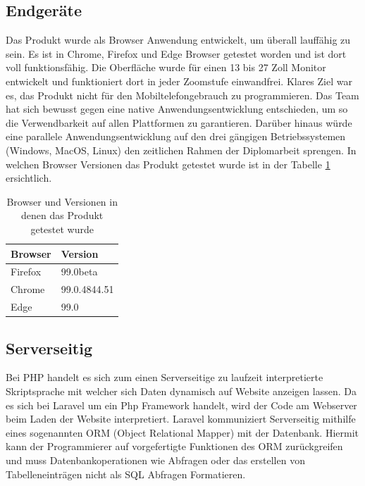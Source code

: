 \subsection{Endgeräte}
Das Produkt wurde als Browser Anwendung entwickelt, um überall lauffähig zu sein. Es ist in Chrome, Firefox und Edge Browser getestet worden und ist dort voll funktionsfähig. Die Oberfläche wurde für einen 13 bis 27 Zoll Monitor entwickelt und funktioniert dort in jeder Zoomstufe einwandfrei. Klares Ziel war es, das Produkt nicht für den Mobiltelefongebrauch zu programmieren. Das Team hat sich bewusst gegen eine native Anwendungsentwicklung entschieden, um so die Verwendbarkeit auf allen Plattformen zu garantieren. Darüber hinaus würde eine parallele Anwendungsentwicklung auf den drei gängigen Betriebssystemen (Windows, MacOS, Linux) den zeitlichen Rahmen der Diplomarbeit sprengen. In welchen Browser Versionen das Produkt getestet wurde ist in der Tabelle \ref{tab:Browser und Versionen in denen das Produkt getestet wurde} ersichtlich. 

\newpage
\begin{table}[h]

	\begin{tabular}{|l|l|}
		\hline
		Browser & Version      \\ \hline
		Firefox & 99.0beta     \\ \hline
		Chrome  & 99.0.4844.51 \\ \hline
		Edge    & 99.0         \\ \hline
	\end{tabular}
\caption{Browser und Versionen in denen das Produkt getestet wurde}
\label{tab:Browser und Versionen in denen das Produkt getestet wurde}
\end{table}


\subsection{Serverseitig}
Bei PHP handelt es sich zum einen Serverseitige zu laufzeit interpretierte Skriptsprache mit welcher sich Daten dynamisch auf Website anzeigen lassen. Da es sich bei Laravel um ein Php Framework handelt, wird der Code am Webserver beim Laden der Website interpretiert. Laravel kommuniziert Serverseitig mithilfe eines sogenannten ORM (Object Relational Mapper) mit der Datenbank. Hiermit kann der Programmierer auf vorgefertigte Funktionen des ORM zurückgreifen und muss Datenbankoperationen wie Abfragen oder das erstellen von Tabelleneinträgen nicht als SQL Abfragen Formatieren.

